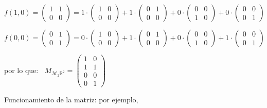 \begin{proofw}
\noindent $f(1,0)=\left( \begin{matrix} 1&1\\0&0 \end{matrix} \right) =
1\cdot \left( \begin{matrix} 1&0\\0&0 \end{matrix} \right)+
1 \cdot \left( \begin{matrix} 0&1\\0&0 \end{matrix} \right)+
0 \cdot \left( \begin{matrix} 0&0\\1&0 \end{matrix} \right)+
0 \cdot \left( \begin{matrix} 0&0\\0&1 \end{matrix} \right) $

\noindent $f(0,0)=\left( \begin{matrix} 0&1\\0&1 \end{matrix} \right) =
0\cdot \left( \begin{matrix} 1&0\\0&0 \end{matrix} \right)+
1 \cdot \left( \begin{matrix} 0&1\\0&0 \end{matrix} \right)+
0 \cdot \left( \begin{matrix} 0&0\\1&0 \end{matrix} \right)+
1 \cdot \left( \begin{matrix} 0&0\\0&1 \end{matrix} \right) $

\noindent por lo que: $\; \; M_{\mathcal M_2 \mathbb R^2}= \left( \begin{matrix} 1&0\\1&1\\0&0\\0&1 \end{matrix} \right)$

\noindent \textcolor{gris}{Funcionamiento de la matriz: por ejemplo,}


\end{proofw}
